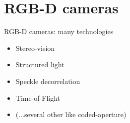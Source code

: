 \documentclass[compress]{beamer}
\begin{document}
\section{RGB-D cameras}

\begin{frame}{RGB-D cameras: many technologies}
    \begin{itemize}
        \item Stereo-vision
        \item Structured light
        \item Speckle decorrelation
        \item Time-of-Flight
        \item (...several other like coded-aperture)
    \end{itemize}
\end{frame}


\end{document}
